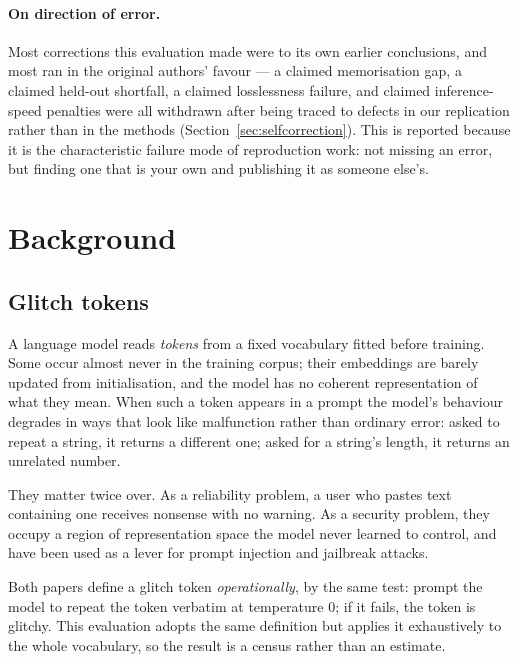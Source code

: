 \paragraph{On direction of error.} Most corrections this evaluation made were to
its own earlier conclusions, and most ran in the original authors' favour --- a
claimed memorisation gap, a claimed held-out shortfall, a claimed losslessness
failure, and claimed inference-speed penalties were all withdrawn after being
traced to defects in our replication rather than in the methods
(Section~\ref{sec:selfcorrection}). This is reported because it is the
characteristic failure mode of reproduction work: not missing an error, but
finding one that is your own and publishing it as someone else's.

\section{Background}

\subsection{Glitch tokens}

A language model reads \emph{tokens} from a fixed vocabulary fitted before
training. Some occur almost never in the training corpus; their embeddings are
barely updated from initialisation, and the model has no coherent representation
of what they mean. When such a token appears in a prompt the model's behaviour
degrades in ways that look like malfunction rather than ordinary error: asked to
repeat a string, it returns a different one; asked for a string's length, it
returns an unrelated number.

They matter twice over. As a reliability problem, a user who pastes text
containing one receives nonsense with no warning. As a security problem, they
occupy a region of representation space the model never learned to control, and
have been used as a lever for prompt injection and jailbreak attacks.

Both papers define a glitch token \emph{operationally}, by the same test: prompt
the model to repeat the token verbatim at temperature $0$; if it fails, the token
is glitchy. This evaluation adopts the same definition but applies it
exhaustively to the whole vocabulary, so the result is a census rather than an
estimate.

